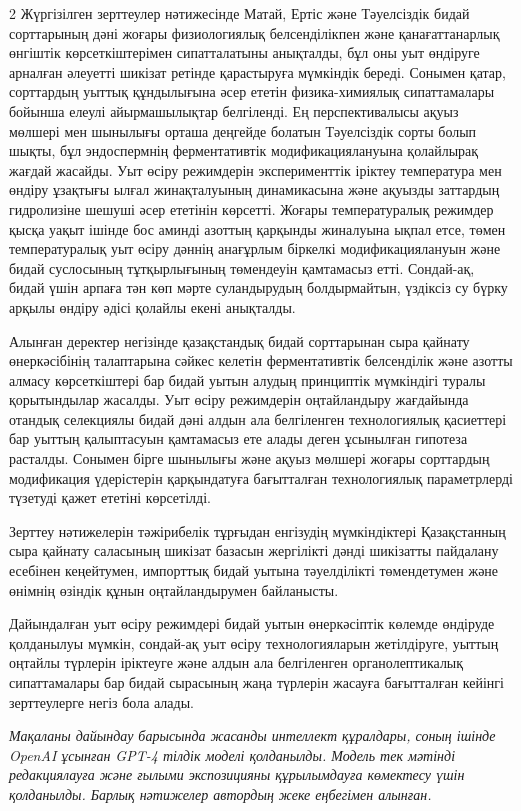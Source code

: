 \begin{multicols}{2}
Жүргізілген зерттеулер нәтижесінде Матай, Ертіс және Тәуелсіздік бидай
сорттарының дәні жоғары физиологиялық белсенділікпен және
қанағаттанарлық өнгіштік көрсеткіштерімен сипатталатыны анықталды, бұл
оны уыт өндіруге арналған әлеуетті шикізат ретінде қарастыруға мүмкіндік
береді. Сонымен қатар, сорттардың уыттық құндылығына әсер ететін
физика-химиялық сипаттамалары бойынша елеулі айырмашылықтар белгіленді.
Ең перспективалысы ақуыз мөлшері мен шынылығы орташа деңгейде болатын
Тәуелсіздік сорты болып шықты, бұл эндоспермнің ферментативтік
модификациялануына қолайлырақ жағдай жасайды. Уыт өсіру режимдерін
эксперименттік іріктеу температура мен өндіру ұзақтығы ылғал
жинақталуының динамикасына және ақуызды заттардың гидролизіне шешуші
әсер ететінін көрсетті. Жоғары температуралық режимдер қысқа уақыт
ішінде бос аминді азоттың қарқынды жиналуына ықпал етсе, төмен
температуралық уыт өсіру дәннің анағұрлым біркелкі модификациялануын
және бидай суслосының тұтқырлығының төмендеуін қамтамасыз етті.
Сондай-ақ, бидай үшін арпаға тән көп мәрте суландырудың болдырмайтын,
үздіксіз су бүрку арқылы өндіру әдісі қолайлы екені анықталды.

Алынған деректер негізінде қазақстандық бидай сорттарынан сыра қайнату
өнеркәсібінің талаптарына сәйкес келетін ферментативтік белсенділік және
азотты алмасу көрсеткіштері бар бидай уытын алудың принциптік мүмкіндігі
туралы қорытындылар жасалды. Уыт өсіру режимдерін оңтайландыру
жағдайында отандық селекциялы бидай дәні алдын ала белгіленген
технологиялық қасиеттері бар уыттың қалыптасуын қамтамасыз ете алады
деген ұсынылған гипотеза расталды. Сонымен бірге шынылығы және ақуыз
мөлшері жоғары сорттардың модификация үдерістерін қарқындатуға
бағытталған технологиялық параметрлерді түзетуді қажет ететіні
көрсетілді.

Зерттеу нәтижелерін тәжірибелік тұрғыдан енгізудің мүмкіндіктері
Қазақстанның сыра қайнату саласының шикізат базасын жергілікті дәнді
шикізатты пайдалану есебінен кеңейтумен, импорттық бидай уытына
тәуелділікті төмендетумен және өнімнің өзіндік құнын оңтайландырумен
байланысты.

Дайындалған уыт өсіру режимдері бидай уытын өнеркәсіптік көлемде
өндіруде қолданылуы мүмкін, сондай-ақ уыт өсіру технологияларын
жетілдіруге, уыттың оңтайлы түрлерін іріктеуге және алдын ала
белгіленген органолептикалық сипаттамалары бар бидай сырасының жаңа
түрлерін жасауға бағытталған кейінгі зерттеулерге негіз бола алады.

\emph{Мақаланы дайындау барысында жасанды интеллект құралдары, соның
ішінде OpenAI ұсынған GPT-4 тілдік моделі қолданылды. Модель тек мәтінді
редакциялауға және ғылыми экспозицияны құрылымдауға көмектесу үшін
қолданылды. Барлық нәтижелер автордың жеке еңбегімен алынған.}
\end{multicols}

